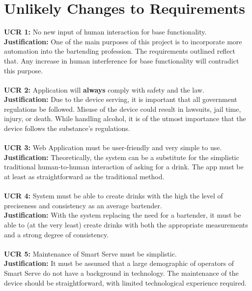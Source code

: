 \documentclass{article}
\begin{document}
\section{Unlikely Changes to Requirements}
    \noindent\textbf{UCR 1:} No new input of human interaction for base functionality. \\

    \noindent\textbf{Justification: }One of the main purposes of this project is to incorporate more automation into the bartending profession. The requirements outlined reflect that. Any increase in human interference for base functionality will contradict this purpose. \\\\
    \noindent\textbf{UCR 2:} Application will \textbf{always} comply with safety and the law. \\

    \noindent\textbf{Justification: }Due to the device serving, it is important that all government regulations be followed. Misuse of the device could result in lawsuits, jail time, injury, or death. While handling alcohol, it is of the utmost importance that the device follows  the substance's regulations.\\\\
    \noindent\textbf{UCR 3:} Web Application must be user-friendly and very simple to use.  \\

    \noindent\textbf{Justification: }Theoretically, the system can be a substitute for the simplistic traditional human-to-human interaction of asking for a drink. The app must be at least as straightforward as the traditional method.\\\\

    \noindent\textbf{UCR 4:} System must be able to create drinks with the high the level of preciseness and consistency as an average bartender.  \\

    \noindent\textbf{Justification: }With  the system replacing the need for a bartender, it must be able to (at the very least) create drinks with both the appropriate measurements and a strong degree of consistency.\\\\
    \noindent\textbf{UCR 5:} Maintenance of Smart Serve must be simplistic.  \\

    \noindent\textbf{Justification: }It must be assumed that a large demographic of operators of Smart Serve do not have a background in technology. The maintenance of the device should be straightforward, with limited technological experience required. 
\newpage
\end{document}
